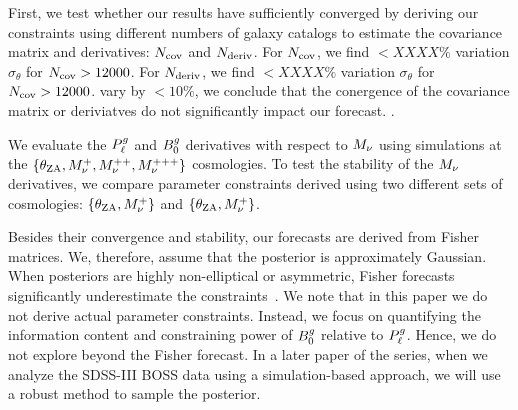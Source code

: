 First, we test whether our results have sufficiently converged by deriving our 
constraints using different numbers of galaxy catalogs to estimate the covariance 
matrix and derivatives: $N_{\rm cov}$ and $N_{\rm deriv}$. For $N_{\rm cov}$,
we find $< XXXX\%$ variation $\sigma_\theta$ for $N_{\rm cov} > 12000$.
For $N_{\rm deriv}$, 
we find $< XXXX\%$ variation $\sigma_\theta$ for $N_{\rm cov} > 12000$.
vary by $< 10\%$, we conclude that the conergence of the covariance matrix or
deriviatves do not significantly impact our forecast. 
. 

We evaluate the $P^g_{\ell}$ and $B^g_0$ derivatives with respect to $M_\nu$ using
simulations at the $\{\theta_{\rm ZA}, M_\nu^+, M_\nu^{++}, M_\nu^{+++}\}$
cosmologies. To test the stability of the $M_\nu$ derivatives, we compare
parameter constraints derived using two different sets of cosmologies: 
$\{\theta_{\rm ZA}, M_\nu^+\}$ and $\{\theta_{\rm ZA}, M_\nu^+\}$. 

Besides their convergence and stability, our forecasts are derived from Fisher
matrices. We, therefore, assume that the posterior is approximately Gaussian. 
When posteriors are highly non-elliptical or asymmetric, Fisher forecasts 
significantly underestimate the constraints~\citep{wolz2012}. We note that in
this paper we do not derive actual parameter constraints. Instead, we focus on
quantifying the information content and constraining power of $B^g_0$ relative to
$P^g_{\ell}$. Hence, we do not explore beyond the Fisher forecast. In a later paper of 
the series, when we analyze the SDSS-III BOSS data using a simulation-based 
approach, we will use a robust method to sample the posterior.  



